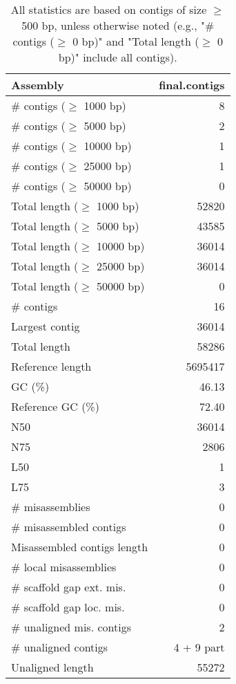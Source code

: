 \documentclass[12pt,a4paper]{article}
\begin{document}
\begin{table}[ht]
\begin{center}
\caption{All statistics are based on contigs of size $\geq$ 500 bp, unless otherwise noted (e.g., "\# contigs ($\geq$ 0 bp)" and "Total length ($\geq$ 0 bp)" include all contigs).}
\begin{tabular}{|l*{1}{|r}|}
\hline
Assembly & final.contigs \\ \hline
\# contigs ($\geq$ 1000 bp) & 8 \\ \hline
\# contigs ($\geq$ 5000 bp) & 2 \\ \hline
\# contigs ($\geq$ 10000 bp) & 1 \\ \hline
\# contigs ($\geq$ 25000 bp) & 1 \\ \hline
\# contigs ($\geq$ 50000 bp) & 0 \\ \hline
Total length ($\geq$ 1000 bp) & 52820 \\ \hline
Total length ($\geq$ 5000 bp) & 43585 \\ \hline
Total length ($\geq$ 10000 bp) & 36014 \\ \hline
Total length ($\geq$ 25000 bp) & 36014 \\ \hline
Total length ($\geq$ 50000 bp) & 0 \\ \hline
\# contigs & 16 \\ \hline
Largest contig & 36014 \\ \hline
Total length & 58286 \\ \hline
Reference length & 5695417 \\ \hline
GC (\%) & 46.13 \\ \hline
Reference GC (\%) & 72.40 \\ \hline
N50 & 36014 \\ \hline
N75 & 2806 \\ \hline
L50 & 1 \\ \hline
L75 & 3 \\ \hline
\# misassemblies & 0 \\ \hline
\# misassembled contigs & 0 \\ \hline
Misassembled contigs length & 0 \\ \hline
\# local misassemblies & 0 \\ \hline
\# scaffold gap ext. mis. & 0 \\ \hline
\# scaffold gap loc. mis. & 0 \\ \hline
\# unaligned mis. contigs & 2 \\ \hline
\# unaligned contigs & 4 + 9 part \\ \hline
Unaligned length & 55272 \\ \hline

\end{tabular}
\end{center}
\end{table}
\end{document}
